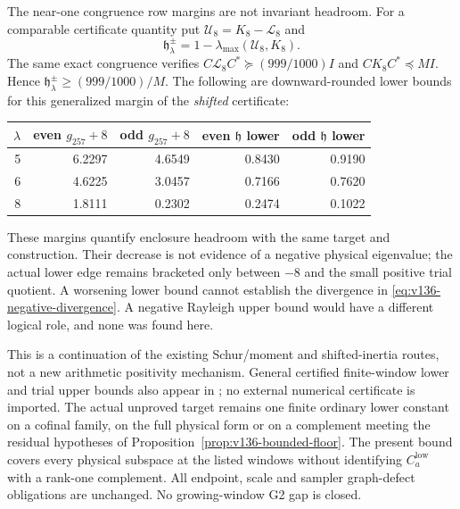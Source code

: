 The near-one congruence row margins are not invariant headroom.
For a comparable certificate quantity put
$\mathcal U_8=K_8-\mathcal L_8$ and
\[
 \mathfrak h_\lambda^\pm
 =1-\lambda_{\max}(\mathcal U_8,K_8).
\]
The same exact congruence verifies
$C\mathcal L_8C^*\succeq(999/1000)I$ and
$CK_8C^*\preceq M I$. Hence
$\mathfrak h_\lambda^\pm\ge(999/1000)/M$.
The following are downward-rounded lower bounds for this generalized
margin of the \emph{shifted} certificate:
\begin{center}
\begin{tabular}{rrrrr}
\toprule
$\lambda$ & even $g_{257}+8$ & odd $g_{257}+8$
 & even $\mathfrak h$ lower & odd $\mathfrak h$ lower\\
\midrule
5&6.2297&4.6549&0.8430&0.9190\\
6&4.6225&3.0457&0.7166&0.7620\\
8&1.8111&0.2302&0.2474&0.1022\\
\bottomrule
\end{tabular}
\end{center}
These margins quantify enclosure headroom with the same target and
construction. Their decrease is not evidence of a negative physical
eigenvalue; the actual lower edge remains bracketed only between
$-8$ and the small positive trial quotient. A worsening lower bound
cannot establish the divergence in
\eqref{eq:v136-negative-divergence}. A negative Rayleigh upper bound
would have a different logical role, and none was found here.

This is a continuation of the existing Schur/moment and shifted-inertia
routes, not a new arithmetic positivity mechanism. General certified
finite-window lower and trial upper bounds also appear in
\cite{Zhu2026}; no external numerical certificate is imported.
The actual unproved target remains one finite ordinary lower constant
on a cofinal family, on the full physical form or on a complement
meeting the residual hypotheses of Proposition~\ref{prop:v136-bounded-floor}.
The present bound covers every physical subspace at the listed windows
without identifying $C_a^{\mathrm{low}}$ with a rank-one complement.
All endpoint, scale and sampler graph-defect obligations are unchanged.
No growing-window G2 gap is closed.

